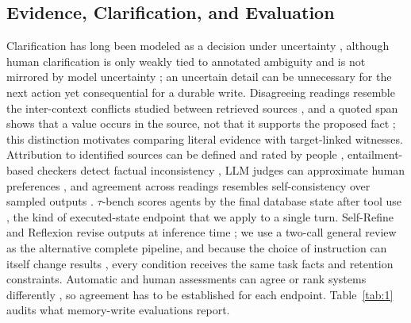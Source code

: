 \documentclass[acmsmall,review]{acmart}
\begin{document}
\subsection{Evidence, Clarification, and Evaluation}
Clarification has long been modeled as a decision under uncertainty \cite{cite43,cite24,cite8,cite9,cite45}, although human clarification is only weakly tied to annotated ambiguity \cite{cite19} and is not mirrored by model uncertainty \cite{cite32}; an uncertain detail can be unnecessary for the next action yet consequential for a durable write. Disagreeing readings resemble the inter-context conflicts studied between retrieved sources \cite{cite38}, and a quoted span shows that a value occurs in the source, not that it supports the proposed fact \cite{cite1}; this distinction motivates comparing literal evidence with target-linked witnesses. Attribution to identified sources can be defined and rated by people \cite{cite25}, entailment-based checkers detect factual inconsistency \cite{cite13}, LLM judges can approximate human preferences \cite{cite46}, and agreement across readings resembles self-consistency over sampled outputs \cite{cite36}. $\tau$-bench scores agents by the final database state after tool use \cite{cite41}, the kind of executed-state endpoint that we apply to a single turn. Self-Refine and Reflexion revise outputs at inference time \cite{cite18,cite29}; we use a two-call general review as the alternative complete pipeline, and because the choice of instruction can itself change results \cite{cite2}, every condition receives the same task facts and retention constraints. Automatic and human assessments can agree \cite{cite30} or rank systems differently \cite{cite28}, so agreement has to be established for each endpoint. Table~\ref{tab:1} audits what memory-write evaluations report.
\end{document}
